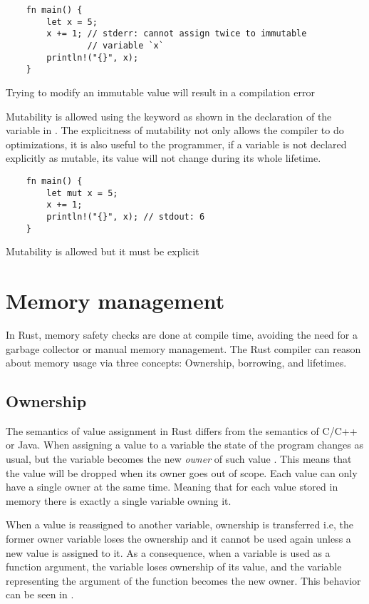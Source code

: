 \begin{listing}[h]
	\begin{verbatim}
    fn main() {
        let x = 5;
        x += 1; // stderr: cannot assign twice to immutable 
                // variable `x`
        println!("{}", x);
    }
	\end{verbatim}
  \caption{Trying to modify an immutable value will result in a compilation error}
  \label{lst:immutable}
\end{listing}

Mutability is allowed using the  keyword as shown in the
declaration of the variable  in . The explicitness
of mutability not only allows the compiler to do optimizations, it is also
useful to the programmer, if a variable is not declared explicitly as mutable,
its value will not change during its whole lifetime.

\begin{listing}[h]
	\begin{verbatim}
    fn main() {
        let mut x = 5;
        x += 1;
        println!("{}", x); // stdout: 6 
    }
	\end{verbatim}
  \caption{Mutability is allowed but it must be explicit}
  \label{lst:mutable}
\end{listing}

\section{Memory management}
In Rust, memory safety checks are done at compile time, avoiding the need for
a garbage collector or manual memory management. The Rust compiler can reason
about memory usage via three concepts: Ownership, borrowing, and lifetimes.

\subsection{Ownership}
The semantics of value assignment in Rust differs from the semantics of C/C++
or Java. When assigning a value to a variable the state of the program changes
as usual, but the variable becomes the new \textit{owner} of such value
\cite{ownership_types}. This means that the value will be dropped when its
owner goes out of scope. Each value can only have a single owner at the same
time.  Meaning that for each value stored in memory there is exactly a single
variable owning it. 

When a value is reassigned to another variable, ownership is transferred i.e,
the former owner variable loses the ownership and it cannot be used again
unless a new value is assigned to it. As a consequence, when a variable is used
as a function argument, the variable loses ownership of its value, and the
variable representing the argument of the function becomes the new owner. This
behavior can be seen in .

